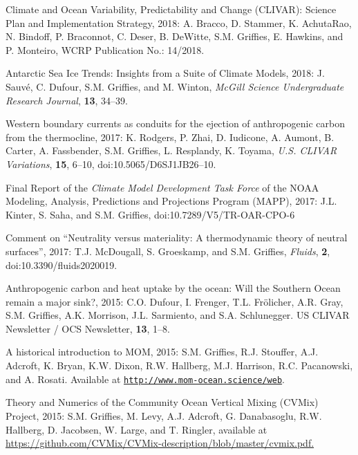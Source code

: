 \begin{etaremune}

\item Climate and Ocean Variability, Predictability and Change (CLIVAR): Science Plan and Implementation Strategy, 2018: 
A. Bracco, D. Stammer, K. AchutaRao, N. Bindoff, 
P. Braconnot, C. Deser, B. DeWitte, S.M. Grif\/f\/ies, E. Hawkins, and P. Monteiro, WCRP Publication No.: 14/2018. 

\item Antarctic Sea Ice Trends: Insights from a Suite of Climate Models, 2018: 
J. Sauv\'{e}, C. Dufour, S.M. Grif\/f\/ies, and M. Winton, {\it McGill Science Undergraduate Research Journal}, {\bf 13}, 34--39. 

\item Western boundary currents as conduits for the ejection of anthropogenic carbon from the thermocline, 2017: K. Rodgers, P. Zhai, D. Iudicone, A. Aumont, B. Carter, A. Fassbender, S.M. Grif\/f\/ies, L. Resplandy, K. Toyama, {\it U.S. CLIVAR Variations}, {\bf 15}, 6--10, doi:10.5065/D6SJ1JB26--10.

\item Final Report of the {\it Climate Model Development Task Force}
  of the NOAA Modeling, Analysis, Predictions and Projections Program
  (MAPP), 2017: J.L. Kinter, S. Saha, and S.M. Grif\/fies, doi:10.7289/V5/TR-OAR-CPO-6

\item Comment on ``Neutrality versus materiality: A thermodynamic
  theory of neutral surfaces'', 2017: T.J. McDougall, S. Groeskamp, and S.M. Grif\/fies, {\it Fluids}, {\bf 2},  doi:10.3390/fluids2020019.

\item Anthropogenic carbon and heat uptake by the ocean: Will the
  Southern Ocean remain a major sink?, 2015: C.O. Dufour, I. Frenger,
  T.L. Fr\"{o}licher, A.R. Gray, S.M. Grif\/f\/ies,
  A.K. Morrison, J.L. Sarmiento, and S.A. Schlunegger.  US CLIVAR
  Newsletter / OCS Newsletter, {\bf 13}, 1--8.

\item A historical introduction to MOM, 2015: S.M. Grif\/f\/ies,
  R.J. Stouffer, A.J. Adcroft, K. Bryan, K.W. Dixon, R.W. Hallberg,
  M.J. Harrison, R.C. Pacanowski, and A. Rosati.  Available at \href{\tt http://www.mom-ocean.science/web/docs/project/mom_history_v15.09.05.pdf}{\tt http://www.mom-ocean.science/web}.
  
  
\item Theory and Numerics of the Community Ocean Vertical Mixing
  (CVMix) Project, 2015: S.M. Grif\/f\/ies, M. Levy, A.J. Adcroft,
  G. Danabasoglu, R.W. Hallberg, D. Jacobsen, W. Large, and
  T. Ringler, available at \href{https://github.com/CVMix/CVMix-description/blob/master/cvmix.pdf}{https://github.com/CVMix/CVMix-description/blob/master/cvmix.pdf.}


\end{etaremune}
